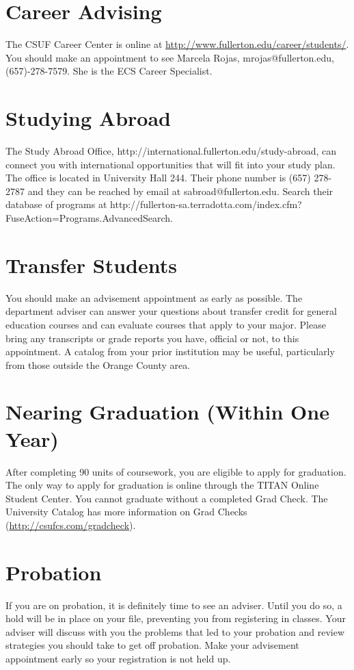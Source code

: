 \documentclass{book}
\newcommand{\shrunkurl}[1]{\url{http://csufcs.com/#1}}
\begin{document}
\section{Career Advising}
The CSUF Career Center is online at
\url{http://www.fullerton.edu/career/students/}. You should make an
appointment to see Marcela Rojas, mrojas@fullerton.edu,
(657)-278-7579. She is the ECS Career Specialist.

\section{Studying Abroad}
The Study Abroad Office,
http://international.fullerton.edu/study-abroad, can connect you with
international opportunities that will fit into your study plan. The
office is located in University Hall 244. Their phone number is (657)
278-2787 and they can be reached by email at
sabroad@fullerton.edu. Search their database of programs at
http://fullerton-sa.terradotta.com/index.cfm?FuseAction=Programs.AdvancedSearch.

\section{Transfer Students}
You should make an advisement appointment as early as possible. The
department adviser can answer your questions about transfer credit for
general education courses and can evaluate courses that apply to your
major. Please bring any transcripts or grade reports you have,
official or not, to this appointment. A catalog from your prior
institution may be useful, particularly from those outside the Orange
County area.

\section{Nearing Graduation (Within One Year)}
After completing 90 units of coursework, you are eligible to apply for
graduation. The only way to apply for graduation is online through the
TITAN Online Student Center. You cannot graduate without a completed
Grad Check.  The University Catalog has more
information on Grad Checks (\shrunkurl{gradcheck}).

\section{Probation}
If you are on probation, it is definitely time to see an
adviser. Until you do so, a hold will be in place on your file,
preventing you from registering in classes. Your adviser will discuss
with you the problems that led to your probation and review strategies
you should take to get off probation. Make your advisement appointment
early so your registration is not held up.
\end{document}
